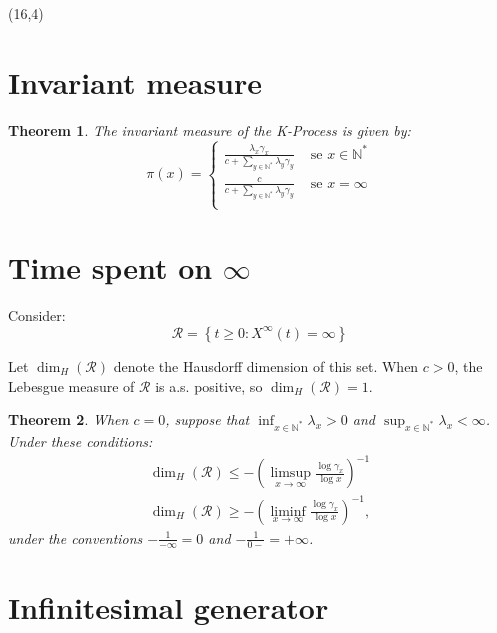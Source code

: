 \documentclass[a1,portrait]{a0poster}
\newtheorem{teorema}{Theorem}
\newcommand{\RR}{{\mathcal{R}}}
\newcommand{\Nz}{{\mathbb{N^*}}}
\begin{document}
\begin{textblock}{15}(16,4) 
  

  \section{Invariant measure}

  \begin{teorema}
    The invariant measure of the K-Process is given by:
    \begin{displaymath}
      \pi(x) = \begin{cases}
        \frac{\lambda_x \gamma_x}{c + \sum_{y \in \Nz} \lambda_y \gamma_y}
        & \textrm{ se } x \in \Nz \\
        \frac{c}{c + \sum_{y \in \Nz} \lambda_y \gamma_y}
        & \textrm{ se } x = \infty \\
      \end{cases}
    \end{displaymath}
  \end{teorema}

  \section{Time spent on $\infty$}

  Consider:
  \begin{displaymath}
    \RR = \left\{ t \geq 0: X^\infty(t) = \infty \right\}
  \end{displaymath}

  Let $\dim_H(\RR)$ denote the Hausdorff dimension of this set. When
  $c > 0$, the Lebesgue measure of $\RR$ is a.s. positive, so
  $\dim_H(\RR) = 1$.

\begin{teorema}
  \label{cor:log-haus}
  When $c = 0$, suppose that $\inf_{x \in \Nz} \lambda_x > 0$ and $\sup_{x \in \Nz}
  \lambda_x < \infty$. Under these conditions:
  \begin{gather*}
    \dim_H(\RR) \leq
    - \left( \limsup_{x \to \infty} \frac{\log \gamma_x}{\log x}
    \right)^{-1} \\
    \dim_H(\RR) \geq
    - \left( \liminf_{x \to \infty} \frac{\log \gamma_x}{\log x}
    \right)^{-1},
  \end{gather*}
  under the conventions $-\frac{1}{-\infty} = 0$ and $-\frac{1}{0-} =
  +\infty$.
\end{teorema}


\section{Infinitesimal generator}


\end{textblock}
\end{document}
